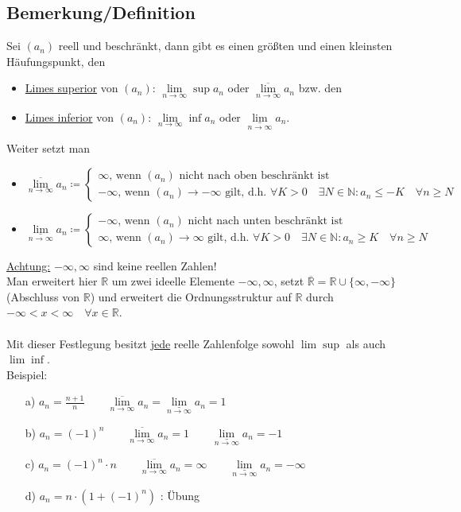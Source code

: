 \documentclass[12pt, titlepage]{article}
\newcommand{\R}{\mathds{R}}
\newcommand{\N}{\mathds{N}}
\newcommand{\infn}{n\rightarrow\infty}
\newcommand{\limsuperior}[1]{\lim\limits_{#1}\sup}
\newcommand{\liminferior}[1]{\lim\limits_{#1}\inf}
\renewcommand{\>}{\rightarrow}
\renewcommand{\*}{\cdot}
\renewcommand{\limsup}[1]{\underset{#1}{\overline{\lim}}}
\renewcommand{\liminf}[1]{\underset{#1}{\underline{\lim}}}
\begin{document}
	\subsection{Bemerkung/Definition}
	Sei $(a_n)$ reell und beschränkt, dann gibt es einen größten und einen kleinsten Häufungspunkt, den
	\begin{itemize}
		\item \underline{Limes superior} von $(a_n)$: $\limsuperior{\infn}a_n$ oder $\limsup{\infn}a_n$ bzw. den
		\item \underline{Limes inferior} von $(a_n)$: $\liminferior{\infn}a_n$ oder $\liminf{\infn}a_n$.
	\end{itemize}
	Weiter setzt man
	\begin{itemize}
		\item $\limsup{\infn}a_n\coloneqq\begin{cases}
			\infty\textrm{, wenn }(a_n)\textrm{ nicht nach oben beschränkt ist}\\
			-\infty\textrm{, wenn }(a_n)\>-\infty\textrm{ gilt, d.h. }\forall K>0\quad\exists N\in\N\colon a_n\leq-K\quad\forall n\geq N 
		\end{cases}$
		\item $\liminf{\infn}a_n\coloneqq\begin{cases}
		-\infty\textrm{, wenn }(a_n)\textrm{ nicht nach unten beschränkt ist}\\
		\infty\textrm{, wenn }(a_n)\>\infty\textrm{ gilt, d.h. }\forall K>0\quad\exists N\in\N\colon a_n\geq K\quad\forall n\geq N
		\end{cases}$
	\end{itemize}
	\underline{Achtung:} $-\infty,\infty$ sind keine reellen Zahlen!\\
	Man erweitert hier $\R$ um zwei ideelle Elemente $-\infty,\infty$, setzt $\overline{\R}=\R\cup\{\infty,-\infty\}$ (Abschluss von $\R$) und erweitert die Ordnungsstruktur auf $\R$ durch\\ $-\infty<x<\infty\quad\forall x\in\R$.\\
	\\
	Mit dieser Festlegung besitzt \underline{jede} reelle Zahlenfolge sowohl $\limsuperior{}$ als auch $\liminferior{}$.\\
	Beispiel:
	\begin{itemize}
		\item[a)] $a_n=\frac{n+1}{n}\qquad\limsup{\infn}a_n=\liminf{\infn}a_n=1$
		\item[b)] $a_n=(-1)^n\qquad\limsup{\infn}a_n=1\qquad\liminf{\infn}a_n=-1$
		\item[c)] $a_n=(-1)^n\*n\qquad\limsup{\infn}a_n=\infty\qquad\liminf{\infn}a_n=-\infty$
		\item[d)] $a_n=n\*(1+(-1)^n)$ : Übung
	\end{itemize}
\end{document}
